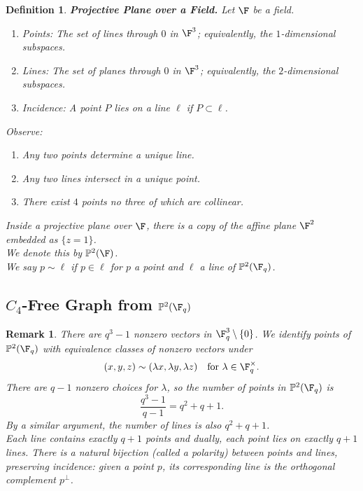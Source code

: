 \documentclass[a4paper]{article}
\newtheorem{defn}[thm]{Definition}
\newtheorem{rmk}[thm]{Remark}
\begin{document}
\begin{defn}
    \textbf{Projective Plane over a Field.} Let $\F$ be a field. 
    \begin{enumerate}
        \item \textit{Points:} The set of lines through $0$ in $\F^3$; equivalently, the $1$-dimensional subspaces.
        \item \textit{Lines:} The set of planes through $0$ in $\F^3$; equivalently, the $2$-dimensional subspaces.
        \item \textit{Incidence:} A point $P$ lies on a line $\ell$ if $P \subset \ell$. 
    \end{enumerate}
    Observe:
    \begin{enumerate}
        \item Any two points determine a unique line.
        \item Any two lines intersect in a unique point.
        \item There exist $4$ points no three of which are collinear.
    \end{enumerate}
    Inside a projective plane over $\F$, there is a copy of the affine plane $\F^2$ embedded as $\{z=1\}$.\\
    We denote this by $\mathbb{P}^2(\F)$.\\
    We say $p\sim \ell$ if $p\in \ell$ for $p$ a point and $\ell$ a line of $\mathbb{P}^2(\F_q)$.
\end{defn}

\subsection{$C_4$-Free Graph from $\mathbb{P}^2(\F_q)$}

\begin{rmk}
    There are $q^3 - 1$ nonzero vectors in $\F_q^3 \setminus \{0\}$. We identify points of $\mathbb{P}^2(\F_q)$ with equivalence classes of nonzero vectors under
    \[
        (x, y, z) \sim (\lambda x, \lambda y, \lambda z) \quad \text{for } \lambda \in \F_q^\times.
    \]
    There are $q-1$ nonzero choices for $\lambda$, so the number of points in $\mathbb{P}^2(\F_q)$ is
    \[
        \frac{q^3-1}{q-1} = q^2 + q + 1.
    \]
    By a similar argument, the number of lines is also $q^2 + q + 1$.\\
    Each line contains exactly $q + 1$ points and dually, each point lies on exactly $q + 1$ lines. There is a natural bijection (called a \emph{polarity}) between points and lines, preserving incidence: given a point $p$, its corresponding line is the orthogonal complement $p^\perp$.
\end{rmk}
\end{document}

